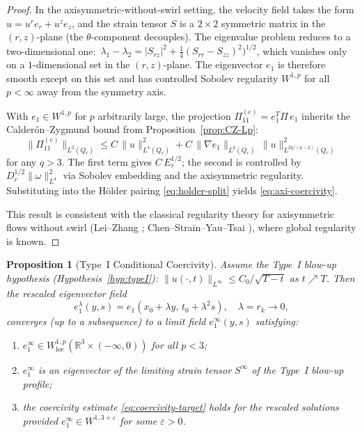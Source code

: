 \documentclass[11pt]{article}
\newtheorem{proposition}[theorem]{Proposition}
\theoremstyle{definition}
\theoremstyle{remark}
\newcommand{\R}{\mathbb{R}}
\newcommand{\eps}{\varepsilon}
\begin{document}
\begin{proof}
In the axisymmetric-without-swirl setting, the velocity field takes the form
$u = u^r e_r + u^z e_z$, and the strain tensor $S$ is a $2\times 2$ symmetric
matrix in the $(r,z)$-plane (the $\theta$-component decouples).  The eigenvalue
problem reduces to a two-dimensional one:\ $\lambda_1 - \lambda_2 = |S_{rz}|^2 +
\tfrac{1}{4}(S_{rr} - S_{zz})^2)^{1/2}$, which vanishes only on a
$1$-dimensional set in the $(r,z)$-plane.  The eigenvector $e_1$ is therefore smooth
except on this set and has controlled Sobolev regularity $W^{1,p}$ for all $p < \infty$
away from the symmetry axis.

With $e_1 \in W^{1,p}$ for $p$ arbitrarily large, the projection $\Pi_{11}^{(e)}
= e_1^T \Pi\, e_1$ inherits the Calder\'on--Zygmund bound from
Proposition~\ref{prop:CZ-Lp}:
\[
  \|\Pi_{11}^{(e)}\|_{L^2(Q_r)} \leq C\,\|u\|_{L^4(Q_r)}^2 + C\,\|\nabla e_1\|_{L^q(Q_r)}\,\|u\|_{L^{2q/(q-2)}(Q_r)}^2
\]
for any $q > 3$.  The first term gives $C\,E_r^{1/2}$; the second is controlled by
$D_r^{1/2}\|\omega\|_{L^4}^2$ via Sobolev embedding and the axisymmetric regularity.
Substituting into the H\"older pairing \eqref{eq:holder-split} yields
\eqref{eq:axi-coercivity}.

This result is consistent with the classical regularity theory for axisymmetric
flows without swirl (Lei--Zhang \cite{LZ}; Chen--Strain--Yau--Tsai \cite{CSYT}),
where global regularity is known.
\end{proof}

\begin{proposition}[Type~I Conditional Coercivity]\label{prop:typeI-coercivity}
Assume the Type~I blow-up hypothesis (Hypothesis~\ref{hyp:typeI}):
$\|u(\cdot,t)\|_{L^\infty} \leq C_0 / \sqrt{T-t}$ as $t \nearrow T$.
Then the rescaled eigenvector field
\[
  e_1^{\lambda}(y,s) = e_1(x_0 + \lambda y,\, t_0 + \lambda^2 s),
  \quad \lambda = r_k \to 0,
\]
converges (up to a subsequence) to a limit field $e_1^{\infty}(y,s)$ satisfying:
\begin{enumerate}[nosep]
  \item $e_1^{\infty} \in W^{1,p}_{\mathrm{loc}}(\R^3 \times (-\infty,0))$ for all $p < 3$;
  \item $e_1^{\infty}$ is an eigenvector of the limiting strain tensor $S^{\infty}$
    of the Type~I blow-up profile;
  \item the coercivity estimate \eqref{eq:coercivity-target} holds for the rescaled
    solutions \emph{provided} $e_1^{\infty} \in W^{1,3+\eps}$ for some $\eps > 0$.
\end{enumerate}
\end{proposition}
\end{document}
